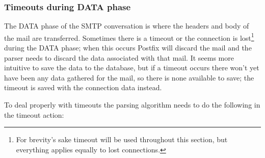 \documentclass[a4paper,12pt,draft]{article}
\begin{document}
\subsubsection{Timeouts during DATA phase}

\label{timeouts-during-data-phase}

The DATA phase of the SMTP conversation is where the headers and body of the
mail are transferred.  Sometimes there is a timeout or the connection is
lost\footnote{For brevity's sake timeout will be used throughout this
section, but everything applies equally to lost connections.} during the
DATA phase; when this occurs Postfix will discard the mail and the parser
needs to discard the data associated with that mail.  It seems more
intuitive to save the data to the database, but if a timeout occurs there
won't yet have been any data gathered for the mail, so there is none
available to save; the timeout is saved with the connection data instead.

To deal properly with timeouts the parsing algorithm needs to do the
following in the timeout action:
\end{document}
